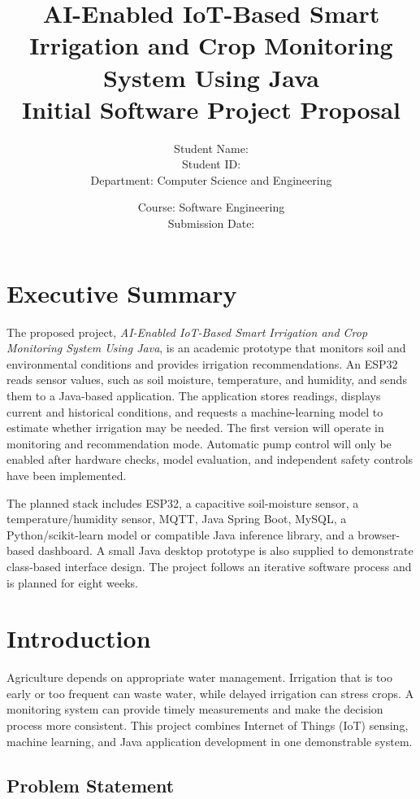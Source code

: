 \documentclass[12pt,a4paper]{report}
\title{\Large\bfseries AI-Enabled IoT-Based Smart Irrigation and Crop Monitoring System Using Java\\[0.5em]

\large Initial Software Project Proposal}
\author{Student Name: \underline{\hspace{6cm}}\\Student ID: \underline{\hspace{6cm}}\\Department: Computer Science and Engineering}
\date{Course: Software Engineering\\Submission Date: \underline{\hspace{4cm}}}
\begin{document}
\maketitle


\tableofcontents

\listoffigures

\clearpage


\chapter{Executive Summary}

The proposed project, \textit{AI-Enabled IoT-Based Smart Irrigation and Crop Monitoring System Using Java}, is an academic prototype that monitors soil and environmental conditions and provides irrigation recommendations. An ESP32 reads sensor values, such as soil moisture, temperature, and humidity, and sends them to a Java-based application. The application stores readings, displays current and historical conditions, and requests a machine-learning model to estimate whether irrigation may be needed. The first version will operate in monitoring and recommendation mode. Automatic pump control will only be enabled after hardware checks, model evaluation, and independent safety controls have been implemented.

The planned stack includes ESP32, a capacitive soil-moisture sensor, a temperature/humidity sensor, MQTT, Java Spring Boot, MySQL, a Python/scikit-learn model or compatible Java inference library, and a browser-based dashboard. A small Java desktop prototype is also supplied to demonstrate class-based interface design. The project follows an iterative software process and is planned for eight weeks.

\chapter{Introduction}

Agriculture depends on appropriate water management. Irrigation that is too early or too frequent can waste water, while delayed irrigation can stress crops. A monitoring system can provide timely measurements and make the decision process more consistent. This project combines Internet of Things (IoT) sensing, machine learning, and Java application development in one demonstrable system.

\section{Problem Statement}
\end{document}
